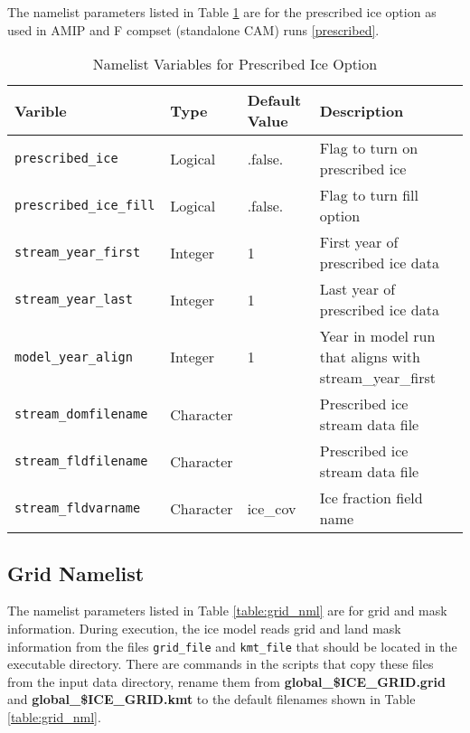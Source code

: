 The namelist parameters listed in Table \ref{table:ice_prescribed_nml} are for
the prescribed ice option as used in AMIP and F compset (standalone CAM) runs
\ref{prescribed}.

\begin{table}
  \begin{center}
  \caption{Namelist Variables for Prescribed Ice Option}
  \label{table:ice_prescribed_nml}
  \begin{tabular}{p{4.0cm}p{2.0cm}p{3cm}p{6.0cm}} \hline
  Varible & Type & Default Value & Description               \\
\hline \hline

{\tt prescribed\_ice} & Logical & .false. &  Flag to turn on prescribed ice \\

{\tt prescribed\_ice\_fill } & Logical & .false. &  Flag to turn fill option \\

{\tt stream\_year\_first } & Integer & 1 & First year of prescribed ice data \\

{\tt stream\_year\_last } & Integer & 1 & Last year of prescribed ice data \\

{\tt model\_year\_align } & Integer & 1 & Year in model run that aligns with stream\_year\_first \\

{\tt stream\_domfilename } & Character & & Prescribed ice stream data file \\

{\tt stream\_fldfilename } & Character & & Prescribed ice stream data file \\

{\tt stream\_fldvarname } & Character &  ice\_cov &  Ice fraction field name \\

  \hline
  \end{tabular}
  \end{center}
\end{table}

\subsection{Grid Namelist}

The namelist parameters listed in Table \ref{table:grid_nml} are for
grid and mask information.  During execution, the ice model reads grid and 
land mask information from the files {\tt grid\_file} and {\tt kmt\_file} that 
should be located in the executable directory. There are commands in the 
scripts that copy these files from the input data directory, rename them from 
{\bf global\_\${ICE\_GRID}.grid} and {\bf global\_\${ICE\_GRID}.kmt} to the
default filenames shown in Table \ref{table:grid_nml}.


